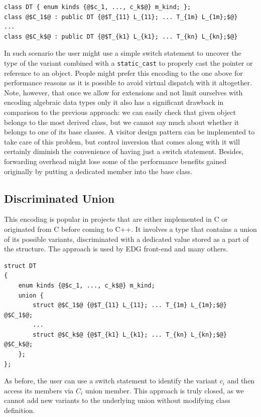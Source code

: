 \documentclass[preprint]{sigplanconf}
\makeatletter
\DeclareRobustCommand{\code}[1]{{\lstinline[breaklines=false,escapechar=@]{#1}}}
\makeatother
\begin{document}
\begin{lstlisting}[keepspaces,columns=flexible]
class DT { enum kinds {@$c_1, ..., c_k$@} m_kind; };
class @$C_1$@ : public DT {@$T_{11} L_{11}; ... T_{1m} L_{1m};$@} 
...
class @$C_k$@ : public DT {@$T_{k1} L_{k1}; ... T_{kn} L_{kn};$@} 
\end{lstlisting}

In such scenario the user might use a simple switch statement to uncover the 
type of the variant combined with a \code{static_cast} to properly cast the 
pointer or reference to an object. People might prefer this encoding to the one 
above for performance reasons as it is possible to avoid virtual dispatch with 
it altogether. Note, however, that once we allow for extensions and not limit 
ourselves with encoding algebraic data types only it also has a significant 
drawback in comparison to the previous approach: we can easily check that given 
object belongs to the most derived class, but we cannot say much about whether 
it belongs to one of its base classes. A visitor design pattern can be 
implemented to take care of this problem, but control inversion that comes along 
with it will certainly diminish the convenience of having just a switch 
statement. Besides, forwarding overhead might lose some of the performance 
benefits gained originally by putting a dedicated member into the base class.

\subsection{Discriminated Union}
\label{sec:du}

This encoding is popular in projects that are either implemented in C or 
originated from C before coming to C++. It involves a type that contains a union 
of its possible variants, discriminated with a dedicated value stored as a part 
of the structure. The approach is used by EDG front-end\cite{EDG} and many others.

\begin{lstlisting}[keepspaces,columns=flexible]
struct DT
{
    enum kinds {@$c_1, ..., c_k$@} m_kind;
    union {
        struct @$C_1$@ {@$T_{11} L_{11}; ... T_{1m} L_{1m};$@} @$C_1$@;
        ...
        struct @$C_k$@ {@$T_{k1} L_{k1}; ... T_{kn} L_{kn};$@} @$C_k$@; 
    };
};
\end{lstlisting}

As before, the user can use a switch statement to identify the variant $c_i$ and 
then access its members via $C_i$ union member. This approach is truly closed, as 
we cannot add new variants to the underlying union without modifying class 
definition. 
\end{document}
